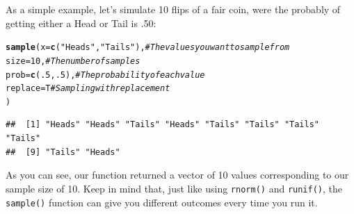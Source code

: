 \documentclass{tufte-book}\usepackage[]{graphicx}\usepackage[]{color}
\makeatletter
\newcommand{\hlnum}[1]{\textcolor[rgb]{0.686,0.059,0.569}{#1}}%
\newcommand{\hlstr}[1]{\textcolor[rgb]{0.192,0.494,0.8}{#1}}%
\newcommand{\hlcom}[1]{\textcolor[rgb]{0.678,0.584,0.686}{\textit{#1}}}%
\newcommand{\hlstd}[1]{\textcolor[rgb]{0.345,0.345,0.345}{#1}}%
\newcommand{\hlkwc}[1]{\textcolor[rgb]{0.333,0.667,0.333}{#1}}%
\newcommand{\hlkwd}[1]{\textcolor[rgb]{0.737,0.353,0.396}{\textbf{#1}}}%
\newenvironment{kframe}{%
 \def\at@end@of@kframe{}%
 \ifinner\ifhmode%
  \def\at@end@of@kframe{\end{minipage}}%
  \begin{minipage}{\columnwidth}%
 \fi\fi%
 \def\FrameCommand##1{\hskip\@totalleftmargin \hskip-\fboxsep
 \colorbox{shadecolor}{##1}\hskip-\fboxsep
     \hskip-\linewidth \hskip-\@totalleftmargin \hskip\columnwidth}%
 \MakeFramed {\advance\hsize-\width
   \@totalleftmargin\z@ \linewidth\hsize
   \@setminipage}}%
 {\par\unskip\endMakeFramed%
 \at@end@of@kframe}
\newenvironment{knitrout}{}{} %
\makeatother
\begin{document}
As a simple example, let's simulate 10 flips of a fair coin, were the probably of getting either a Head or Tail is .50:

\begin{footnotesize}
\begin{knitrout}
\color{fgcolor}\begin{kframe}
\begin{alltt}
\hlkwd{sample}\hlstd{(}\hlkwc{x} \hlstd{=} \hlkwd{c}\hlstd{(}\hlstr{"Heads"}\hlstd{,} \hlstr{"Tails"}\hlstd{),} \hlcom{# The values you want to sample from}
       \hlkwc{size} \hlstd{=} \hlnum{10}\hlstd{,}  \hlcom{# The number of samples}
       \hlkwc{prob} \hlstd{=} \hlkwd{c}\hlstd{(}\hlnum{.5}\hlstd{,} \hlnum{.5}\hlstd{),} \hlcom{# The probability of each value}
       \hlkwc{replace} \hlstd{= T} \hlcom{# Sampling with replacement}
       \hlstd{)}
\end{alltt}
\begin{verbatim}
##  [1] "Heads" "Heads" "Tails" "Heads" "Tails" "Tails" "Tails" "Tails"
##  [9] "Tails" "Heads"
\end{verbatim}
\end{kframe}
\end{knitrout}
\end{footnotesize}

As you can see, our function returned a vector of 10 values corresponding to our sample size of 10. Keep in mind that, just like using \texttt{rnorm()} and \texttt{runif()}, the \texttt{sample()} function can give you different outcomes every time you run it.
\end{document}
